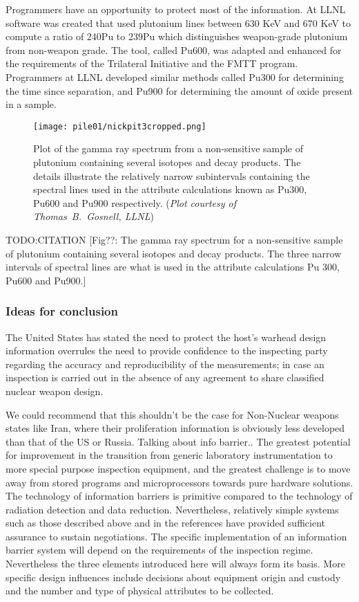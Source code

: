 \documentclass[twoside,titlepage,11pt,twocolumn,a4paper]{article}
\begin{document}
Programmers have an opportunity to protect most of the information. At
LLNL software was created that used plutonium lines between 630 KeV
and 670 KeV to compute a ratio of 240Pu to 239Pu which distinguishes
weapon-grade plutonium from non-weapon grade. The tool, called Pu600,
was adapted and enhanced for the requirements of the Trilateral
Initiative and the FMTT program. Programmers at LLNL developed similar
methods called Pu300 for determining the time since separation, and
Pu900 for determining the amount of oxide present in a sample.

\begin{figure}
  \texttt{[image: pile01/nickpit3cropped.png]}
  \caption{Plot of the gamma ray spectrum from a non-sensitive sample
    of plutonium containing several isotopes and decay products. The
    details illustrate the relatively narrow subintervals containing
    the spectral lines used in the attribute calculations known as
    Pu300, Pu600 and Pu900 respectively. (\emph{Plot courtesy of
      Thomas~B.~Gosnell, LLNL})}
\end{figure}

TODO:CITATION
\citep{wolford2000} [Fig??: The gamma ray
  spectrum for a non-sensitive sample of plutonium containing several
  isotopes and decay products. The three narrow intervals of spectral
  lines are what is used in the attribute calculations Pu 300, Pu600
  and Pu900.]

\subsubsection{Ideas for conclusion}
The United States has stated the need to protect the host's warhead
design information overrules the need to provide confidence to the
inspecting party regarding the accuracy and reproducibility of the
measurements; in case an inspection is carried out in the absence of
any agreement to share classified nuclear weapon design.

We could recommend that this shouldn't be the case for Non-Nuclear
weapons states like Iran, where their proliferation information is
obviously less developed than that of the US or Russia.  Talking about
info barrier.. The greatest potential for improvement in the
transition from generic laboratory instrumentation to more special
purpose inspection equipment, and the greatest challenge is to move
away from stored programs and microprocessors towards pure hardware
solutions.  The technology of information barriers is primitive
compared to the technology of radiation detection and data
reduction. Nevertheless, relatively simple systems such as those
described above and in the references have provided sufficient
assurance to sustain negotiations. The specific implementation of an
information barrier system will depend on the requirements of the
inspection regime. Nevertheless the three elements introduced here
will always form its basis. More specific design influences include
decisions about equipment origin and custody and the number and type
of physical attributes to be collected. \citep{wolford2000}
\end{document}
